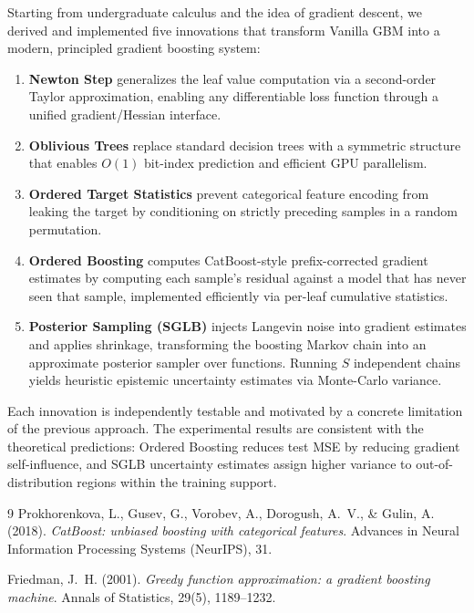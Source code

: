 \documentclass[11pt, a4paper]{article}
\begin{document}
Starting from undergraduate calculus and the idea of gradient descent,
we derived and implemented five innovations that transform Vanilla GBM
into a modern, principled gradient boosting system:

\begin{enumerate}
  \item \textbf{Newton Step} generalizes the leaf value computation via a
    second-order Taylor approximation, enabling any differentiable loss function
    through a unified gradient/Hessian interface.
  \item \textbf{Oblivious Trees} replace standard decision trees with a
    symmetric structure that enables $O(1)$ bit-index prediction and
    efficient GPU parallelism.
  \item \textbf{Ordered Target Statistics} prevent categorical feature encoding
    from leaking the target by conditioning on strictly preceding samples
    in a random permutation.
  \item \textbf{Ordered Boosting} computes CatBoost-style prefix-corrected gradient estimates
    by computing each sample's residual against a model that has never
    seen that sample, implemented efficiently via per-leaf cumulative statistics.
  \item \textbf{Posterior Sampling (SGLB)} injects Langevin noise into
    gradient estimates and applies shrinkage, transforming the boosting
    Markov chain into an approximate posterior sampler over functions.
    Running $S$ independent chains yields heuristic epistemic uncertainty estimates
    via Monte-Carlo variance.
\end{enumerate}

Each innovation is independently testable and motivated by a concrete
limitation of the previous approach. The experimental results are consistent
with the theoretical predictions: Ordered Boosting reduces test MSE by
reducing gradient self-influence, and SGLB uncertainty estimates
assign higher variance to out-of-distribution regions within the
training support.

\begin{thebibliography}{9}
Prokhorenkova, L., Gusev, G., Vorobev, A., Dorogush, A.~V., \& Gulin, A. (2018).
\textit{CatBoost: unbiased boosting with categorical features}.
Advances in Neural Information Processing Systems (NeurIPS), 31.

Friedman, J.~H. (2001).
\textit{Greedy function approximation: a gradient boosting machine}.
Annals of Statistics, 29(5), 1189--1232.
\end{thebibliography}
\end{document}
